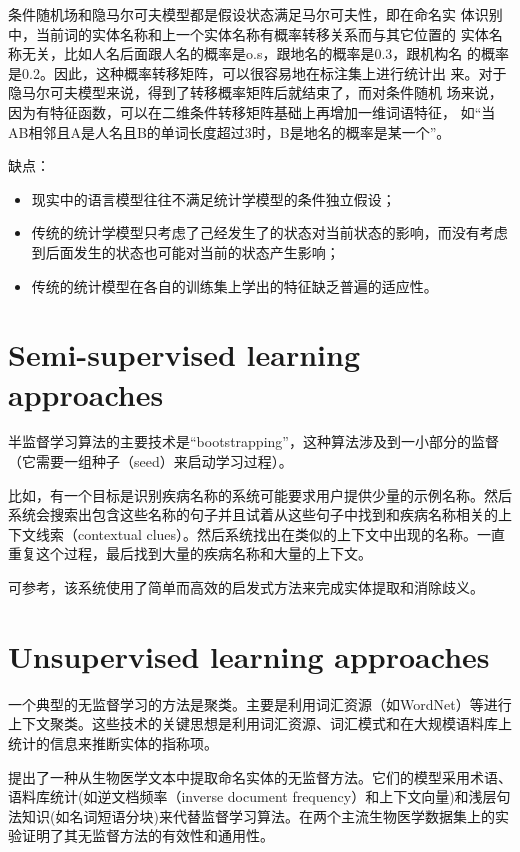 \documentclass[a4paper,UTF8,no-math]{ctexart}
\begin{document}
	条件随机场和隐马尔可夫模型都是假设状态满足马尔可夫性，即在命名实
	体识别中，当前词的实体名称和上一个实体名称有概率转移关系而与其它位置的
	实体名称无关，比如人名后面跟人名的概率是o.s，跟地名的概率是0.3，跟机构名
	的概率是0.2。因此，这种概率转移矩阵，可以很容易地在标注集上进行统计出
	来。对于隐马尔可夫模型来说，得到了转移概率矩阵后就结束了，而对条件随机
	场来说，因为有特征函数，可以在二维条件转移矩阵基础上再增加一维词语特征，
	如“当AB相邻且A是人名且B的单词长度超过3时，B是地名的概率是某一个”。

	缺点\citep{隋臣2017基于深度学习的中文命名实体识别研究}：
	\begin{itemize}
		\item 现实中的语言模型往往不满足统计学模型的条件独立假设；
		\item 传统的统计学模型只考虑了己经发生了的状态对当前状态的影响，而没有考虑到后面发生的状态也可能对当前的状态产生影响；
		\item 传统的统计模型在各自的训练集上学出的特征缺乏普遍的适应性。
	\end{itemize}
	
	
	\section{Semi-supervised learning approaches}
	
	半监督学习算法的主要技术是“bootstrapping”，这种算法涉及到一小部分的监督（它需要一组种子（seed）来启动学习过程）。
	
	比如，有一个目标是识别疾病名称的系统可能要求用户提供少量的示例名称。然后系统会搜索出包含这些名称的句子并且试着从这些句子中找到和疾病名称相关的上下文线索（contextual clues）。然后系统找出在类似的上下文中出现的名称。一直重复这个过程，最后找到大量的疾病名称和大量的上下文。
	
	可参考\citep{nadeau2006unsupervised}，该系统使用了简单而高效的启发式方法来完成实体提取和消除歧义。
	
	
	
	\section{Unsupervised learning approaches}
	
	一个典型的无监督学习的方法是聚类。主要是利用词汇资源（如WordNet）等进行上下文聚类。这些技术的关键思想是利用词汇资源、词汇模式和在大规模语料库上统计的信息来推断实体的指称项。
	
	\citep{zhang2013unsupervised}提出了一种从生物医学文本中提取命名实体的无监督方法。它们的模型采用术语、语料库统计(如逆文档频率（inverse document frequency）和上下文向量)和浅层句法知识(如名词短语分块)来代替监督学习算法。在两个主流生物医学数据集上的实验证明了其无监督方法的有效性和通用性。 
	
\end{document}
